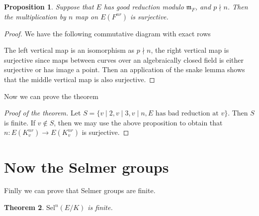 \documentclass{article}
\newtheorem{thm}{Theorem}
\newtheorem{prop}[thm]{Proposition}
\begin{document}
\begin{prop}
Suppose that $ E $ has good reduction modulo $ \mathfrak{m}_{F} $,
and $ p\nmid n $.
Then the multiplication by $ n $ map on $ E (F ^{nr}) $ is surjective.
\end{prop}

\begin{proof}
We have the following commutative diagram with exact rows
\begin{figure}[H]
\centering
{}
\end{figure}
The left vertical map is an isomorphism as $ p\nmid n $,
the right vertical map is surjective since maps between curves over an algebraically closed
field is either surjective or has image a point.
Then an application of the snake lemma shows that the middle vertical map is also surjective.
\end{proof}

Now we can prove the theorem
\begin{proof}
[Proof of the theorem]
Let $ S = \{v\mid 2, v\mid 3, v\mid n, E \text{ has bad reduction at } v\} $.
Then $ S $ is finite.
If $ v\not\in S $, then we may use the above proposition to obtain that
$ n: E (K _{v}^{nr})\to E (K _{v}^{nr}) $ is surjective.
\end{proof}

\section{Now the Selmer groups}

Finlly we can prove that Selmer groups are finite.

\begin{thm}
$ \mathrm{Sel}^{n}(E/K) $ is finite.
\end{thm}
\end{document}
